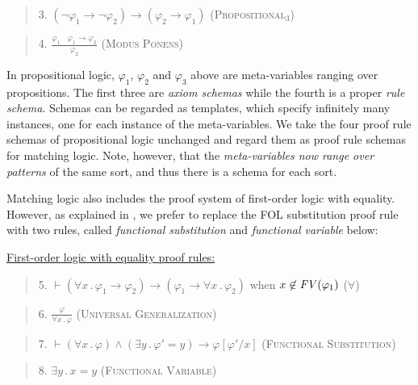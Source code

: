 \documentclass[UTF8,11pt]{article}
\theoremstyle{plain}
\theoremstyle{definition}
\theoremstyle{remark}
\newcommand{\ra}{\rightarrow}
\newcommand{\FV}{{\it FV}}
\begin{document}
\begin{quote}
3. $(\neg \varphi_1 \ra \neg\varphi_2) \ra (\varphi_2 \ra \varphi_1)$
\hfill \textsc{(Propositional$_3$)}
\end{quote}

\begin{quote}
4. $\displaystyle\frac{\varphi_1 \ \ \ \ \varphi_1 \ra \varphi_2}{\varphi_2}$
\hfill \textsc{(Modus Ponens)}
\end{quote}

In propositional logic, $\varphi_1$, $\varphi_2$ and $\varphi_3$ above are
meta-variables ranging over propositions.
The first three are \emph{axiom schemas} while the fourth is a proper
\emph{rule schema}.
Schemas can be regarded as templates, which specify infinitely many instances,
one for each instance of the meta-variables.
We take the four proof rule schemas of propositional logic unchanged and
regard them as proof rule schemas for matching logic.
Note, however, that the \emph{meta-variables now range over patterns} of
the same sort, and thus there is a schema for each sort.

Matching logic also includes the proof system of first-order logic with
equality.
However, as explained in \cite{rosu-2017-lmcs}, we prefer to replace the
FOL substitution proof rule with two rules, called
\emph{functional substitution}
and \emph{functional variable} below:

\vspace*{2ex}

\noindent
\underline{First-order logic with equality proof rules:}

\begin{quote}
5. $\vdash (\forall x\,.\,\varphi_1\ra\varphi_2) \ra (\varphi_1 \ra \forall x\,.\,\varphi_2)$
when $x\not\in\FV(\varphi_1)$
\hfill \textsc{($\forall$)}
\end{quote}

\begin{quote}
6. $\displaystyle\frac{\varphi}{\forall x\,.\,\varphi}$
\hfill \textsc{(Universal Generalization)}
\end{quote}

\begin{quote}
7. $\vdash (\forall x\,.\,\varphi) \wedge
  (\exists y\,.\,\varphi'=y) \ra \varphi[\varphi'/x]$
\hfill \textsc{(Functional Substitution)}
\end{quote}

\begin{quote}
8. $\exists y\,.\,x=y$
\hfill \textsc{(Functional Variable)}
\end{quote}
\end{document}
